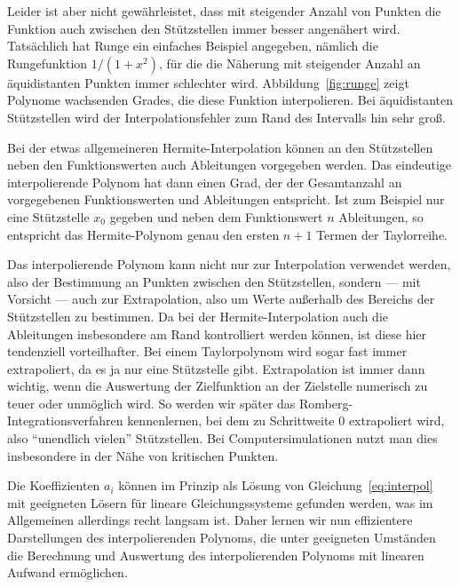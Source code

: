 Leider ist aber nicht gewährleistet, dass mit steigender Anzahl von
Punkten die Funktion auch zwischen den Stützstellen immer besser
angenähert wird. Tatsächlich hat Runge ein einfaches Beispiel
angegeben, nämlich die Rungefunktion $1/(1+x^2)$, für die die Näherung
mit steigender Anzahl an äquidistanten Punkten immer schlechter
wird. Abbildung~\ref{fig:runge} zeigt Polynome wachsenden Grades, die
diese Funktion interpolieren. Bei äquidistanten Stützstellen wird der
Interpolationsfehler zum Rand des Intervalls hin sehr groß.

Bei der etwas allgemeineren Hermite-Interpolation können an den
Stützstellen neben den Funktionswerten auch Ableitungen vorgegeben
werden. Das eindeutige interpolierende Polynom hat dann einen Grad,
der der Gesamtanzahl an vorgegebenen Funktionswerten und Ableitungen
entspricht. Ist zum Beispiel nur eine Stützstelle $x_0$ gegeben und
neben dem Funktionswert $n$ Ableitungen, so entspricht das
Hermite-Polynom genau den ersten $n+1$ Termen der Taylorreihe.

Das interpolierende Polynom kann nicht nur zur Interpolation verwendet
werden, also der Bestimmung an Punkten zwischen den Stützstellen,
sondern --- mit Vorsicht --- auch zur
Extrapolation, also um Werte außerhalb des
Bereichs der Stützstellen zu bestimmen. Da bei der
Hermite-Interpolation auch die Ableitungen insbesondere am Rand
kontrolliert werden können, ist diese hier tendenziell
vorteilhafter. Bei einem Taylorpolynom wird sogar fast immer
extrapoliert, da es ja nur eine Stützstelle gibt. Extrapolation ist
immer dann wichtig, wenn die Auswertung der Zielfunktion an der
Zielstelle numerisch zu teuer oder unmöglich wird. So werden wir
später das Romberg-Integrationsverfahren kennenlernen, bei dem zu
Schrittweite 0 extrapoliert wird, also \enquote{unendlich vielen}
Stützstellen. Bei Computersimulationen nutzt man dies insbesondere in
der Nähe von kritischen Punkten.

Die Koeffizienten $a_i$ können im Prinzip als Lösung von
Gleichung~\eqref{eq:interpol} mit geeigneten Lösern für lineare
Gleichungssysteme gefunden werden, was im Allgemeinen allerdings recht
langsam ist. Daher lernen wir nun effizientere Darstellungen des
interpolierenden Polynoms, die unter geeigneten Umständen die
Berechnung und Auswertung des interpolierenden Polynoms mit linearen
Aufwand ermöglichen.


\subsection{}

